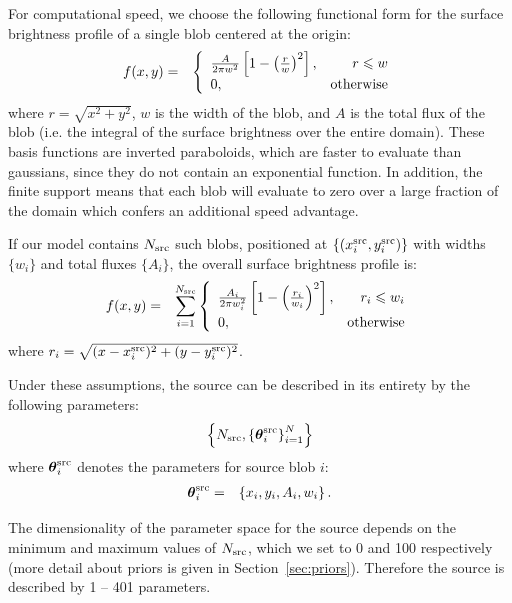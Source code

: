 \documentclass[useAMS,usenatbib]{mn2e}
\begin{document}
For computational speed, we choose the following
functional form for the surface brightness profile
of a single blob centered at the origin:
\begin{eqnarray}
f(x, y) &=& \left\{
\begin{array}{lr}
\frac{A}{2\pi w^2}\left[1 - \left(\frac{r}{w}\right)^2\right], & r \leq w\\
0, & \textnormal{otherwise}
\end{array}
\right.
\end{eqnarray}
where $r = \sqrt{x^2 + y^2}$, $w$ is the width of the blob, and $A$ is the
total flux of the blob (i.e. the integral of the surface brightness over the
entire domain).
These basis functions are inverted paraboloids, which are faster to evaluate
than gaussians, since they do not
contain an exponential function. In addition, the finite support means that
each blob will evaluate to zero over a large fraction of the domain which
confers an additional speed advantage.

If our model contains $N_{\rm src}$ such blobs, positioned at
$\left\{(x_i^{\rm src}, y_i^{\rm src})\right\}$ with widths $\{w_i\}$ and total fluxes
$\{A_i\}$, the overall surface brightness profile is:
\begin{eqnarray}
f(x, y) &=& \sum_{i=1}^{N_{\rm src}}\left\{
\begin{array}{lr}
\frac{A_i}{2\pi w_i^2}\left[1 - \left(\frac{r_i}{w_i}\right)^2\right], & r_i \leq w_i\\
0, & \textnormal{otherwise}
\end{array}
\right.
\end{eqnarray}
where $r_i = \sqrt{(x - x_i^{\rm src})^2 + (y - y_i^{\rm src})^2}$.

Under these assumptions, the source can be described in its entirety
by the following parameters:
\begin{eqnarray}
\left\{
N_{\rm src}, \left\{\boldsymbol{\theta}^{\rm src}_i\right\}_{i=1}^N
\right\}
\end{eqnarray}
where $\boldsymbol{\theta}^{\rm src}_i$ denotes the parameters for source blob $i$:
\begin{eqnarray}
\boldsymbol{\theta}^{\rm src}_i &=& \left\{x_i, y_i, A_i, w_i
\right\}.
\end{eqnarray}

The dimensionality of the parameter space for the source depends on the
minimum and maximum values of $N_{\rm src}$, which we set to 0 and 100
respectively (more detail about priors is given in Section~\ref{sec:priors}).
Therefore the source is described by 1 -- 401 parameters.
\end{document}
